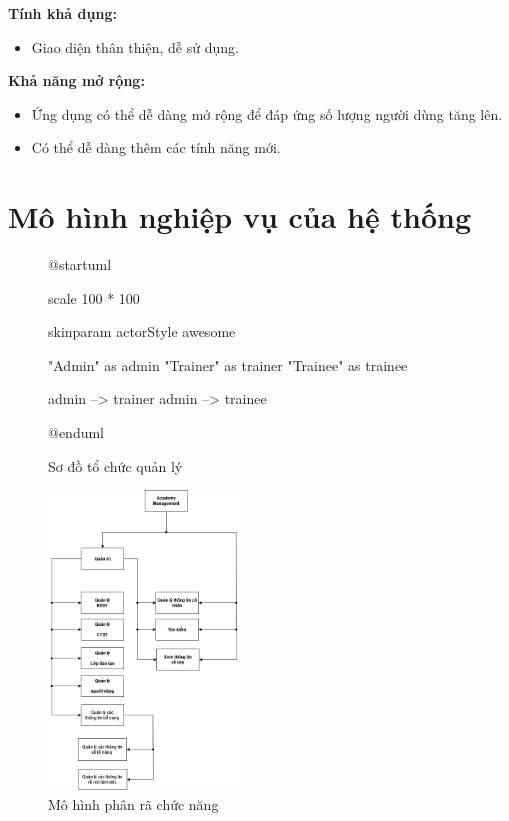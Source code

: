 \documentclass[report.tex]{subfiles}
\begin{document}
\textbf{Tính khả dụng:}

\begin{itemize}[noitemsep]
\item Giao diện thân thiện, dễ sử dụng.
\end{itemize}

\textbf{Khả năng mở rộng:}
\begin{itemize}[noitemsep]
\item Ứng dụng có thể dễ dàng mở rộng để đáp ứng số lượng người dùng tăng lên.
\item Có thể dễ dàng thêm các tính năng mới.
\end{itemize}

\section{Mô hình nghiệp vụ của hệ thống}

\begin{figure}[!ht]
\begin{plantuml}

@startuml

scale 100 * 100

skinparam actorStyle awesome

"Admin" as admin
"Trainer" as trainer
"Trainee" as trainee

admin --> trainer
admin --> trainee

@enduml

\end{plantuml}
\caption{Sơ đồ tổ chức quản lý}
\end{figure}
\FloatBarrier

\begin{figure}[!htb]
{\centering
\includegraphics[height=300px]{../meta/dfd.png}
\caption{Mô hình phân rã chức năng}
\par
}
\end{figure}
\FloatBarrier
\end{document}
